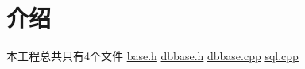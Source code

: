 \hypertarget{index_介绍}{}\section{介绍}\label{index_介绍}
本工程总共只有4个文件 \hyperlink{base_8h}{base.\-h} \hyperlink{dbbase_8h}{dbbase.\-h} \hyperlink{dbbase_8cpp}{dbbase.\-cpp} \hyperlink{sql_8cpp}{sql.\-cpp} \par
 